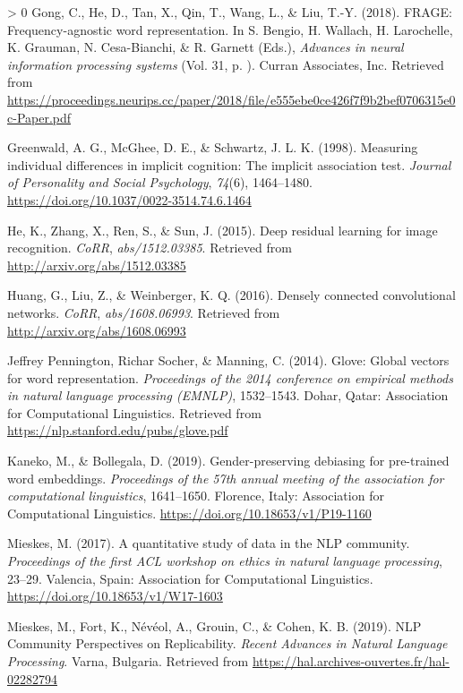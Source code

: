 \documentclass[
  english,
  man,floatsintext]{apa6}
\newlength{\cslhangindent}
\newenvironment{CSLReferences}[3] %
 {%
  \setlength{\parindent}{0pt}
  \ifodd #1 \everypar{\setlength{\hangindent}{\cslhangindent}}\ignorespaces\fi
  \ifnum #2 > 0
  \setlength{\parskip}{#3\baselineskip}
  \fi
 }%
 {}
\begin{document}
\begin{CSLReferences}{1}{0}
\leavevmode\hypertarget{ref-gong_2018}{}%
Gong, C., He, D., Tan, X., Qin, T., Wang, L., \& Liu, T.-Y. (2018). FRAGE: Frequency-agnostic word representation. In S. Bengio, H. Wallach, H. Larochelle, K. Grauman, N. Cesa-Bianchi, \& R. Garnett (Eds.), \emph{Advances in neural information processing systems} (Vol. 31, p. ). Curran Associates, Inc. Retrieved from \url{https://proceedings.neurips.cc/paper/2018/file/e555ebe0ce426f7f9b2bef0706315e0c-Paper.pdf}

\leavevmode\hypertarget{ref-greenwald_1998}{}%
Greenwald, A. G., McGhee, D. E., \& Schwartz, J. L. K. (1998). Measuring individual differences in implicit cognition: The implicit association test. \emph{Journal of Personality and Social Psychology}, \emph{74}(6), 1464--1480. \url{https://doi.org/10.1037/0022-3514.74.6.1464}

\leavevmode\hypertarget{ref-he_2015}{}%
He, K., Zhang, X., Ren, S., \& Sun, J. (2015). Deep residual learning for image recognition. \emph{CoRR}, \emph{abs/1512.03385}. Retrieved from \url{http://arxiv.org/abs/1512.03385}

\leavevmode\hypertarget{ref-huang_2016}{}%
Huang, G., Liu, Z., \& Weinberger, K. Q. (2016). Densely connected convolutional networks. \emph{CoRR}, \emph{abs/1608.06993}. Retrieved from \url{http://arxiv.org/abs/1608.06993}

\leavevmode\hypertarget{ref-pennington_2014}{}%
Jeffrey Pennington, Richar Socher, \& Manning, C. (2014). Glove: Global vectors for word representation. \emph{Proceedings of the 2014 conference on empirical methods in natural language processing (EMNLP)}, 1532--1543. Dohar, Qatar: Association for Computational Linguistics. Retrieved from \url{https://nlp.stanford.edu/pubs/glove.pdf}

\leavevmode\hypertarget{ref-kaneko_2019}{}%
Kaneko, M., \& Bollegala, D. (2019). Gender-preserving debiasing for pre-trained word embeddings. \emph{Proceedings of the 57th annual meeting of the association for computational linguistics}, 1641--1650. Florence, Italy: Association for Computational Linguistics. \url{https://doi.org/10.18653/v1/P19-1160}

\leavevmode\hypertarget{ref-mieskes_2017}{}%
Mieskes, M. (2017). A quantitative study of data in the {NLP} community. \emph{Proceedings of the first {ACL} workshop on ethics in natural language processing}, 23--29. Valencia, Spain: Association for Computational Linguistics. \url{https://doi.org/10.18653/v1/W17-1603}

\leavevmode\hypertarget{ref-mieskes_2019}{}%
Mieskes, M., Fort, K., Névéol, A., Grouin, C., \& Cohen, K. B. (2019). {NLP Community Perspectives on Replicability.} \emph{{Recent Advances in Natural Language Processing}}. Varna, Bulgaria. Retrieved from \url{https://hal.archives-ouvertes.fr/hal-02282794}


\end{CSLReferences}
\end{document}
